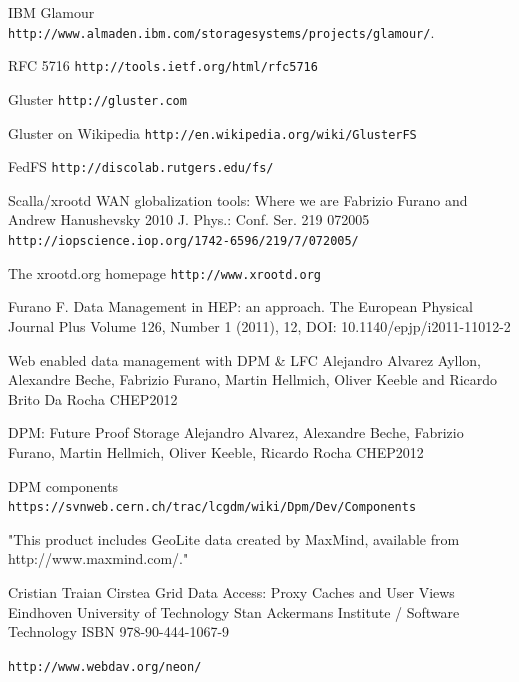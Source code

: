 \documentclass[12pt]{article} %
\begin{document}
\begin{thebibliography}{9}

 IBM Glamour \lstinline"http://www.almaden.ibm.com/storagesystems/projects/glamour/". 


 RFC 5716
\lstinline"http://tools.ietf.org/html/rfc5716"


 Gluster
\lstinline"http://gluster.com"

 Gluster on Wikipedia
\lstinline"http://en.wikipedia.org/wiki/GlusterFS"


 FedFS
\lstinline"http://discolab.rutgers.edu/fs/"

 Scalla/xrootd WAN globalization tools: Where we are
Fabrizio Furano and Andrew Hanushevsky 2010 J. Phys.: Conf. Ser. 219 072005
\lstinline"http://iopscience.iop.org/1742-6596/219/7/072005/"

 The xrootd.org homepage
\lstinline"http://www.xrootd.org"

Furano F. Data Management in HEP: an approach. 
The European Physical Journal Plus
Volume 126, Number 1 (2011), 12, DOI: 10.1140/epjp/i2011-11012-2

Web enabled data management with DPM \& LFC
Alejandro Alvarez Ayllon, Alexandre Beche, Fabrizio Furano, Martin Hellmich, Oliver Keeble and Ricardo Brito Da Rocha
CHEP2012

DPM: Future Proof Storage
Alejandro Alvarez, Alexandre Beche, Fabrizio Furano, Martin Hellmich, Oliver Keeble, Ricardo Rocha
CHEP2012

 DPM components
\lstinline"https://svnweb.cern.ch/trac/lcgdm/wiki/Dpm/Dev/Components"

"This product includes GeoLite data created by MaxMind, available from http://www.maxmind.com/."

Cristian Traian Cirstea
Grid Data Access: Proxy Caches and User Views
Eindhoven University of Technology
Stan Ackermans Institute / Software Technology
ISBN 978-90-444-1067-9


\lstinline"http://www.webdav.org/neon/"

\end{thebibliography}
\end{document}

